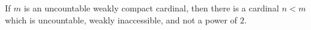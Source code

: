 If $m$ is an uncountable weakly compact cardinal, then there is a cardinal $n < m$ which is uncountable, weakly inaccessible, and not a power of $2$.
